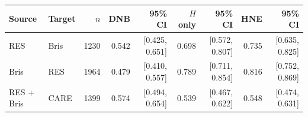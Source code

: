 \begin{tabular*}{\linewidth}{@{\extracolsep{\fill}}llrrrrrrr@{}}
\toprule
Source & Target & $n$ & DNB & 95\% CI & $H$ only & 95\% CI & HNE & 95\% CI \\
\midrule
RES & Bris & 1230 & 0.542 & [0.425, 0.651] & 0.698 & [0.572, 0.807] & 0.735 & [0.635, 0.825] \\
Bris & RES & 1964 & 0.479 & [0.410, 0.557] & 0.789 & [0.711, 0.854] & 0.816 & [0.752, 0.869] \\
RES + Bris & CARE & 1399 & 0.574 & [0.494, 0.654] & 0.539 & [0.467, 0.622] & 0.548 & [0.474, 0.631] \\
\bottomrule
\end{tabular*}